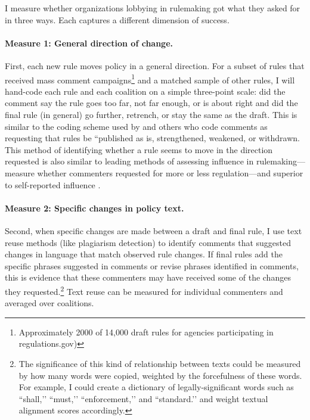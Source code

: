 I measure whether organizations lobbying in rulemaking got what they asked for in three ways. Each captures a different dimension of success. 

\paragraph{Measure 1: General direction of change.}
First, each new rule moves policy in a general direction. For a subset of rules that received mass comment campaigns\footnote{Approximately 2000 of 14,000 draft rules for agencies participating in regulations.gov)} and a matched sample of other rules, I will hand-code each rule and each coalition on a simple three-point scale: did the comment say the rule goes too far, not far enough, or is about right and did the final rule (in general) go further, retrench, or stay the same as the draft. This is similar to the coding scheme used by \citep{Potter2017} and others who code comments as requesting that rules be ``published as is, strengthened, weakened, or withdrawn. This method of identifying whether a rule seems to move in the direction requested is also similar to leading  methods of assessing influence in rulemaking---\citet{Yackee2006JOP} measure whether commenters requested for more or less regulation---and superior to self-reported influence \citep{Furlong1997}.

\paragraph{Measure 2: Specific changes in policy text.} Second, when specific changes are made between a draft and final rule, I use text reuse methods (like plagiarism detection) to identify comments that suggested changes in language that match observed rule changes. %
If final rules add the specific phrases suggested in comments or revise phrases identified in comments, this is evidence that these commenters may have received some of the changes they requested.\footnote{The significance of this kind of relationship between texts could be measured by how many words were copied, weighted by the forcefulness of these words. For example, I could create a dictionary of legally-significant words such as ``shall,’’ ``must,’’ ``enforcement,’’ and ``standard.’’ and weight textual alignment scores accordingly.} Text reuse can be measured for individual commenters and averaged over coalitions.

